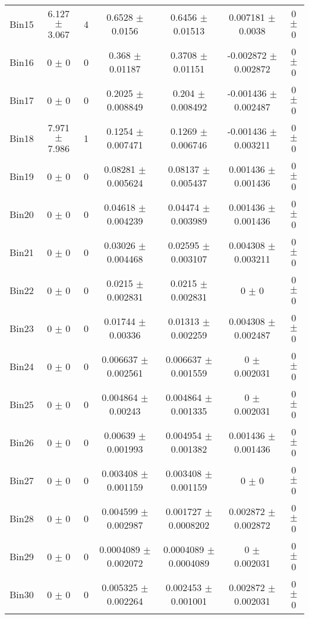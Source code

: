 \begin{tabular}{@{\extracolsep{4pt}}lcccccc@{}}
     Bin15 & 6.127 $\pm$ 3.067 & 4 & 0.6528 $\pm$ 0.0156 & 0.6456 $\pm$ 0.01513 & 0.007181 $\pm$ 0.0038 & 0 $\pm$ 0 \\ 
     Bin16 & 0 $\pm$ 0 & 0 & 0.368 $\pm$ 0.01187 & 0.3708 $\pm$ 0.01151 & -0.002872 $\pm$ 0.002872 & 0 $\pm$ 0 \\ 
     Bin17 & 0 $\pm$ 0 & 0 & 0.2025 $\pm$ 0.008849 & 0.204 $\pm$ 0.008492 & -0.001436 $\pm$ 0.002487 & 0 $\pm$ 0 \\ 
     Bin18 & 7.971 $\pm$ 7.986 & 1 & 0.1254 $\pm$ 0.007471 & 0.1269 $\pm$ 0.006746 & -0.001436 $\pm$ 0.003211 & 0 $\pm$ 0 \\ 
     Bin19 & 0 $\pm$ 0 & 0 & 0.08281 $\pm$ 0.005624 & 0.08137 $\pm$ 0.005437 & 0.001436 $\pm$ 0.001436 & 0 $\pm$ 0 \\ 
     Bin20 & 0 $\pm$ 0 & 0 & 0.04618 $\pm$ 0.004239 & 0.04474 $\pm$ 0.003989 & 0.001436 $\pm$ 0.001436 & 0 $\pm$ 0 \\ 
     Bin21 & 0 $\pm$ 0 & 0 & 0.03026 $\pm$ 0.004468 & 0.02595 $\pm$ 0.003107 & 0.004308 $\pm$ 0.003211 & 0 $\pm$ 0 \\ 
     Bin22 & 0 $\pm$ 0 & 0 & 0.0215 $\pm$ 0.002831 & 0.0215 $\pm$ 0.002831 & 0 $\pm$ 0 & 0 $\pm$ 0 \\ 
     Bin23 & 0 $\pm$ 0 & 0 & 0.01744 $\pm$ 0.00336 & 0.01313 $\pm$ 0.002259 & 0.004308 $\pm$ 0.002487 & 0 $\pm$ 0 \\ 
     Bin24 & 0 $\pm$ 0 & 0 & 0.006637 $\pm$ 0.002561 & 0.006637 $\pm$ 0.001559 & 0 $\pm$ 0.002031 & 0 $\pm$ 0 \\ 
     Bin25 & 0 $\pm$ 0 & 0 & 0.004864 $\pm$ 0.00243 & 0.004864 $\pm$ 0.001335 & 0 $\pm$ 0.002031 & 0 $\pm$ 0 \\ 
     Bin26 & 0 $\pm$ 0 & 0 & 0.00639 $\pm$ 0.001993 & 0.004954 $\pm$ 0.001382 & 0.001436 $\pm$ 0.001436 & 0 $\pm$ 0 \\ 
     Bin27 & 0 $\pm$ 0 & 0 & 0.003408 $\pm$ 0.001159 & 0.003408 $\pm$ 0.001159 & 0 $\pm$ 0 & 0 $\pm$ 0 \\ 
     Bin28 & 0 $\pm$ 0 & 0 & 0.004599 $\pm$ 0.002987 & 0.001727 $\pm$ 0.0008202 & 0.002872 $\pm$ 0.002872 & 0 $\pm$ 0 \\ 
     Bin29 & 0 $\pm$ 0 & 0 & 0.0004089 $\pm$ 0.002072 & 0.0004089 $\pm$ 0.0004089 & 0 $\pm$ 0.002031 & 0 $\pm$ 0 \\ 
     Bin30 & 0 $\pm$ 0 & 0 & 0.005325 $\pm$ 0.002264 & 0.002453 $\pm$ 0.001001 & 0.002872 $\pm$ 0.002031 & 0 $\pm$ 0 \\ 
\hline\hline
  \end{tabular}
